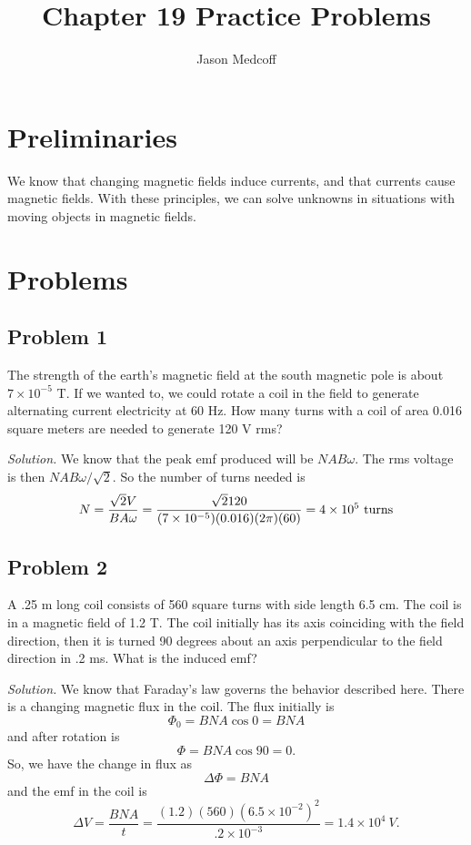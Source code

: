 \documentclass{article}
\title{Chapter 19 Practice Problems}
\author{Jason Medcoff}
\date{}
\begin{document}
	
	\maketitle
	
	\section{Preliminaries}
	
	We know that changing magnetic fields induce currents, and that currents cause magnetic fields. With these principles, we can solve unknowns in situations with moving objects in magnetic fields.
	
	\section{Problems}
	
	\subsection{Problem 1}
	
	The strength of the earth's magnetic field at the south magnetic pole is about $7 \times 10^{-5}$ T. If we wanted to, we could rotate a coil in the field to generate alternating current electricity at 60 Hz. How many turns with a coil of area 0.016 square meters are needed to generate 120 V rms?
	
	
	\textit{Solution.}
	We know that the peak emf produced will be $NAB\omega$. The rms voltage is then $NAB\omega / \sqrt{2}$. So the number of turns needed is
	$$ N = \frac{\sqrt{2} V}{BA\omega} = \frac{\sqrt{2} 120}{(7 \times 10^{-5})(0.016)(2\pi)(60)} \\ = 4 \times 10^5 \ \text{turns}$$
	
	
	\subsection{Problem 2}
	
	A .25 m long coil consists of 560 square turns with side length 6.5 cm. The coil is in a magnetic field of 1.2 T. The coil initially has its axis coinciding with the field direction, then it is turned 90 degrees about an axis perpendicular to the field direction in .2 ms. What is the induced emf?
	
	\textit{Solution.}
	We know that Faraday's law governs the behavior described here. There is a changing magnetic flux in the coil. The flux initially is
	$$ \Phi_0 = BNA\cos0 = BNA $$
	and after rotation is
	$$ \Phi = BNA\cos90 = 0 . $$
	So, we have the change in flux as
	$$ \Delta \Phi = BNA $$
	and the emf in the coil is
	$$ \Delta V = \frac{BNA}{t} = \frac{(1.2)(560)(6.5\times 10^{-2})^2}{.2\times 10^{-3}} = 1.4 \times 10^4 \ V. $$
	
	
	
	
	
	
	
	
	
	
	
	
	
	
	
	
\end{document}
